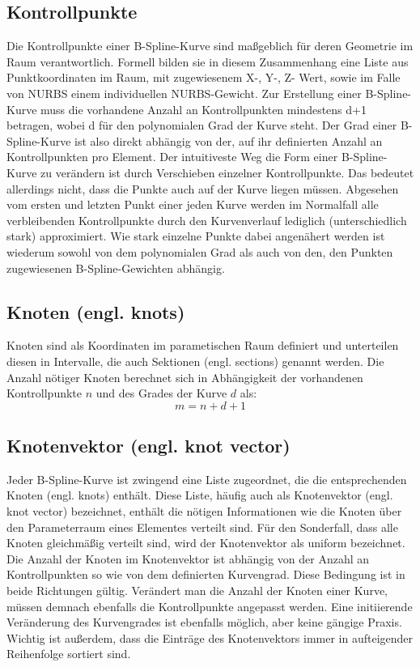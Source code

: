 \documentclass[german,a4paper,12pt,oneside]{scrbook}
\theoremstyle{definition}
\theoremstyle{definition}
\theoremstyle{definition}
\theoremstyle{definition}
\theoremstyle{definition}
\theoremstyle{definition}
\begin{document}
\subsection{Kontrollpunkte}
Die Kontrollpunkte einer B-Spline-Kurve sind maßgeblich für deren Geometrie im Raum verantwortlich. Formell bilden sie in diesem Zusammenhang eine Liste aus Punktkoordinaten im Raum, mit zugewiesenem X-, Y-, Z- Wert, sowie im Falle von NURBS einem individuellen NURBS-Gewicht. Zur Erstellung einer B-Spline-Kurve muss die vorhandene Anzahl an Kontrollpunkten mindestens d+1 betragen, wobei d für den polynomialen Grad der Kurve steht. Der Grad einer B-Spline-Kurve ist also direkt abhängig von der, auf ihr definierten Anzahl an Kontrollpunkten pro Element. Der intuitiveste Weg die Form einer B-Spline-Kurve zu verändern ist durch Verschieben einzelner Kontrollpunkte. Das bedeutet allerdings nicht, dass die Punkte auch auf der Kurve liegen müssen. Abgesehen vom ersten und letzten Punkt einer jeden Kurve werden im Normalfall alle verbleibenden Kontrollpunkte durch den Kurvenverlauf lediglich (unterschiedlich stark) approximiert. Wie stark einzelne Punkte dabei angenähert werden ist wiederum sowohl von dem polynomialen Grad als auch von den, den Punkten zugewiesenen B-Spline-Gewichten abhängig.

\subsection{Knoten (engl. knots)}
Knoten sind als Koordinaten im parametischen Raum definiert und unterteilen diesen in Intervalle, die auch Sektionen (engl. sections) genannt werden. Die Anzahl nötiger Knoten berechnet sich in Abhängigkeit der vorhandenen Kontrollpunkte $n$ und des Grades der Kurve $d$ als: 
\begin{equation*}
        m = n + d + 1
\end{equation*}

\subsection{Knotenvektor (engl. knot vector)}
\label{subsec:knot vector}
Jeder B-Spline-Kurve ist zwingend eine Liste zugeordnet, die die entsprechenden Knoten (engl. knots) enthält. Diese Liste, häufig auch als Knotenvektor (engl. knot vector) bezeichnet, enthält die nötigen Informationen wie die Knoten über den Parameterraum eines Elementes verteilt sind. Für den Sonderfall, dass alle Knoten gleichmäßig verteilt sind, wird der Knotenvektor als uniform bezeichnet.  Die Anzahl der Knoten im Knotenvektor ist abhängig von der Anzahl an Kontrollpunkten so wie von dem definierten Kurvengrad. Diese Bedingung ist in beide Richtungen gültig. Verändert man die Anzahl der Knoten einer Kurve, müssen demnach ebenfalls die Kontrollpunkte angepasst werden. Eine initiierende Veränderung des Kurvengrades ist ebenfalls möglich, aber keine gängige Praxis. Wichtig ist außerdem, dass die Einträge des Knotenvektors immer in aufteigender Reihenfolge sortiert sind. 
\end{document}
